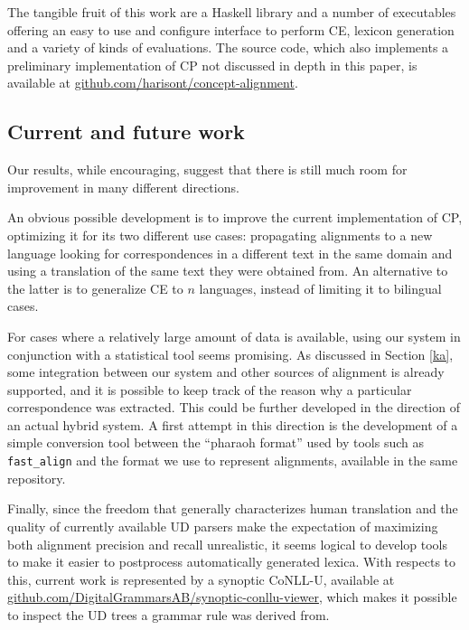 \documentclass[11pt]{article}
\begin{document}
The tangible fruit of this work are a Haskell library and a number of executables offering an easy to use and configure interface to perform CE, lexicon generation and a variety of kinds of evaluations. The source code, which also implements a preliminary implementation of CP not discussed in depth in this paper, is available at \url{github.com/harisont/concept-alignment}.

\subsection{Current and future work}
Our results, while encouraging, suggest that there is still much room for improvement in many different directions.

An obvious possible development is to improve the current implementation of CP, optimizing it for its two different use cases: propagating alignments to a new language looking for correspondences in a different text in the same domain and using a translation of the same text they were obtained from. 
An alternative to the latter is to generalize CE to $n$ languages, instead of limiting it to bilingual cases.

For cases where a relatively large amount of data is available, using our system in conjunction with a statistical tool seems promising. 
As discussed in Section \ref{ka}, some integration between our system and other sources of alignment is already supported, and it is possible to keep track of the reason why a particular correspondence was extracted. 
This could be further developed in the direction of an actual hybrid system. 
A first attempt in this direction is the development of a simple conversion tool between the ``pharaoh format'' used by tools such as \texttt{fast\_align} and the format we use to represent alignments, available in the same repository.

Finally, since the freedom that generally characterizes human translation and the quality of currently available UD parsers make the expectation of maximizing both alignment precision and recall unrealistic, it seems logical to develop tools to make it easier to postprocess automatically generated lexica.
With respects to this, current work is represented by a synoptic CoNLL-U, available at \url{github.com/DigitalGrammarsAB/synoptic-conllu-viewer}, which makes it possible to inspect the UD trees a grammar rule was derived from.

%
%
\end{document}
